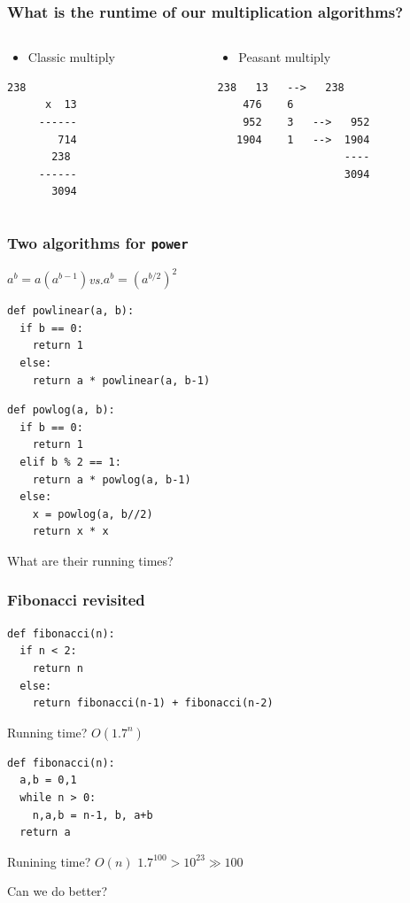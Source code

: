 \documentclass{beamer}
\newcommand{\bi}{\begin{itemize}}
\newcommand{\li}{\item}
\newcommand{\ei}{\end{itemize}}
\newcommand{\bfr}[1]{\begin{frame}[fragile]\frametitle{{ #1 }}}
\newcommand{\cola}{\begin{columns}\begin{column}{0.5\textwidth}}
\newcommand{\colb}{\end{column}\begin{column}{0.5\textwidth}}
\newcommand{\colc}{\end{column}\end{columns}}
\begin{document}
\bfr{What is the runtime of our multiplication algorithms?}
\cola
\bi\li Classic multiply\ei
\begin{Verbatim}[frame=single]
        238
      x  13
     ------
        714      
       238 
     ------
       3094
\end{Verbatim}

\colb
\bi \li Peasant multiply \ei
\begin{Verbatim}[frame=single]
    238   13   -->   238
    476    6
    952    3   -->   952
   1904    1   -->  1904
                    ----
                    3094
\end{Verbatim}                   
\colc

\end{frame}

\bfr{Two algorithms for {\tt power}}

$a^b = a(a^{b-1})$\hfill {\em vs.}\hfill $a^b = (a^{b/2})^2$
\begin{lstlisting}
def powlinear(a, b):
  if b == 0:
    return 1
  else:
    return a * powlinear(a, b-1)
\end{lstlisting}

\begin{lstlisting}
def powlog(a, b):
  if b == 0:
    return 1
  elif b % 2 == 1:
    return a * powlog(a, b-1)
  else:
    x = powlog(a, b//2)
    return x * x
\end{lstlisting}

What are their running times?
\end{frame}

\bfr{Fibonacci revisited}
\begin{lstlisting}
def fibonacci(n):
  if n < 2:
    return n
  else:
    return fibonacci(n-1) + fibonacci(n-2)
\end{lstlisting}
Running time? \pause\hfill
\(O(1.7^n)\)\hfill ~
\begin{lstlisting}
def fibonacci(n):
  a,b = 0,1
  while n > 0:
    n,a,b = n-1, b, a+b
  return a
\end{lstlisting}
Runining time? \pause\hfill
\(O(n)\)
\pause
\hfill
\( 1.7^{100} > 10^{23} \gg 100 \)

\pause
Can we do better?

\end{frame}
\end{document}
